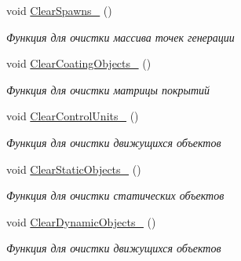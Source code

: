 \begin{DoxyCompactItemize}
\mbox{\label{classrtm_1_1_world_controller_a01b62499764622bf0e08e17456ca3550}} 
void \hyperlink{classrtm_1_1_world_controller_a01b62499764622bf0e08e17456ca3550}{Clear\+Spawns\+\_\+} ()
\begin{DoxyCompactList}\small\item\em Функция для очистки массива точек генерации \end{DoxyCompactList}\item 
\mbox{\label{classrtm_1_1_world_controller_a8dbb12f485207fe3cddbc686b0f28797}} 
void \hyperlink{classrtm_1_1_world_controller_a8dbb12f485207fe3cddbc686b0f28797}{Clear\+Coating\+Objects\+\_\+} ()
\begin{DoxyCompactList}\small\item\em Функция для очистки матрицы покрытий \end{DoxyCompactList}\item 
\mbox{\label{classrtm_1_1_world_controller_aacf88f1ea0c2a81ed1da34a0147f32f9}} 
void \hyperlink{classrtm_1_1_world_controller_aacf88f1ea0c2a81ed1da34a0147f32f9}{Clear\+Control\+Units\+\_\+} ()
\begin{DoxyCompactList}\small\item\em Функция для очистки движущихся объектов \end{DoxyCompactList}\item 
\mbox{\label{classrtm_1_1_world_controller_a0f6b29410a02d1fa480fdec29e9b5827}} 
void \hyperlink{classrtm_1_1_world_controller_a0f6b29410a02d1fa480fdec29e9b5827}{Clear\+Static\+Objects\+\_\+} ()
\begin{DoxyCompactList}\small\item\em Функция для очистки статических объектов \end{DoxyCompactList}\item 
\mbox{\label{classrtm_1_1_world_controller_ad32b6c19479b509c06c8b03364e707af}} 
void \hyperlink{classrtm_1_1_world_controller_ad32b6c19479b509c06c8b03364e707af}{Clear\+Dynamic\+Objects\+\_\+} ()
\begin{DoxyCompactList}\small\item\em Функция для очистки движущихся объектов \end{DoxyCompactList}\end{DoxyCompactItemize}
